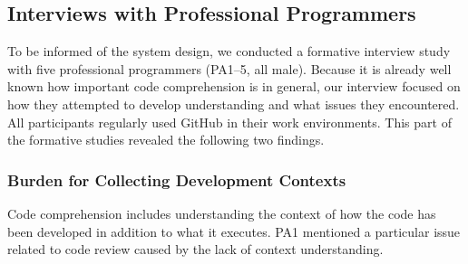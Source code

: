 \label{section:Formative_Study}

\subsection{Interviews with Professional Programmers}
To be informed of the system design, we conducted a formative interview study with five professional programmers (PA1--5, all male).
Because it is already well known how important code comprehension is in general, our interview focused on how they attempted to develop understanding and what issues they encountered.
All participants regularly used GitHub in their work environments.
This part of the formative studies revealed the following two findings.

\subsubsection{Burden for Collecting Development Contexts}


Code comprehension includes understanding the context of how the code has been developed in addition to what it executes.
PA1 mentioned a particular issue related to code review caused by the lack of context understanding.


